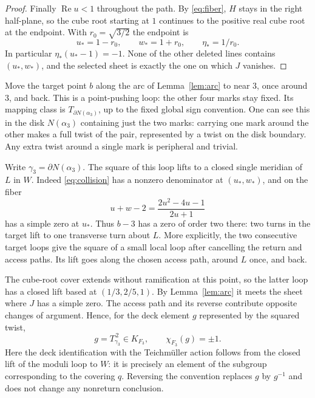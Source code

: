 \documentclass[11pt]{article}
\theoremstyle{remark}
\begin{document}
\begin{proof}
Finally $\operatorname{Re}u<1$ throughout the path. By \eqref{eq:fiber}, $H$ stays in the right half-plane, so the cube root starting at $1$ continues to the positive real cube root at the endpoint. With $r_0=\sqrt{3/2}$ the endpoint is
\[
 u_*=1-r_0,\qquad w_*=1+r_0,\qquad \eta_*=1/r_0.
\]
In particular $\eta_*(u_*-1)=-1$. None of the other deleted lines contains $(u_*,w_*)$, and the selected sheet is exactly the one on which $J$ vanishes.
\end{proof}


Move the target point $b$ along the arc of Lemma~\ref{lem:arc} to near $3$, once around $3$, and back. This is a point-pushing loop: the other four marks stay fixed. Its mapping class is $T_{\partial N(\alpha_3)}$, up to the fixed global sign convention. One can see this in the disk $N(\alpha_3)$ containing just the two marks: carrying one mark around the other makes a full twist of the pair, represented by a twist on the disk boundary. Any extra twist around a single mark is peripheral and trivial.

Write $\gamma_3=\partial N(\alpha_3)$. The square of this loop lifts to a closed single meridian of $L$ in $W$. Indeed \eqref{eq:collision} has a nonzero denominator at $(u_*,w_*)$, and on the fiber
\[
 u+w-2=\frac{2u^2-4u-1}{2u+1}
\]
has a simple zero at $u_*$. Thus $b-3$ has a zero of order two there: two turns in the target lift to one transverse turn about $L$. More explicitly, the two consecutive target loops give the square of a small local loop after cancelling the return and access paths. Its lift goes along the chosen access path, around $L$ once, and back.

The cube-root cover extends without ramification at this point, so the latter loop has a closed lift based at $(1/3,2/5,1)$. By Lemma~\ref{lem:arc} it meets the sheet where $J$ has a simple zero. The access path and its reverse contribute opposite changes of argument. Hence, for the deck element $g$ represented by the squared twist,
\begin{equation}\label{eq:chi}
 g=T_{\gamma_3}^{\,2}\in K_{F_3},\qquad
 \chi_{F_3}(g)=\pm1.
\end{equation}
Here the deck identification with the Teichm\"uller action follows from the closed lift of the moduli loop to $W$: it is precisely an element of the subgroup corresponding to the covering $q$. Reversing the convention replaces $g$ by $g^{-1}$ and does not change any nonreturn conclusion.
\end{document}
